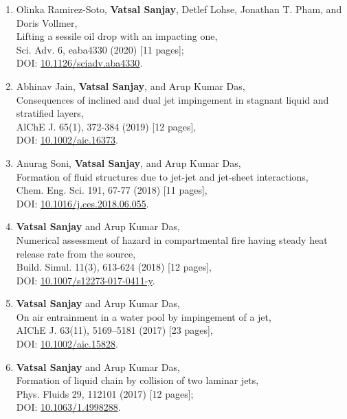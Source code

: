 \documentclass[11pt,a4paper,roman,english,colorlinks,linkcolor=true]{moderncv}
\begin{document}
\begin{enumerate}[leftmargin=2.5cm]
	\item Olinka Ramirez-Soto, \textbf{Vatsal Sanjay},  Detlef Lohse,  Jonathan T. Pham, and Doris Vollmer,\\
	Lifting a sessile oil drop with an impacting one,\\
	Sci. Adv. 6, eaba4330  (2020) [11 pages];\\
	DOI: \href{https://doi.org/10.1126/sciadv.aba4330}{10.1126/sciadv.aba4330}.	
	
	\item Abhinav Jain, \textbf{Vatsal Sanjay}, and Arup Kumar Das,\\
	Consequences of inclined and dual jet impingement in stagnant liquid and stratified layers,\\
	AlChE J. 65(1), 372-384  (2019) [12 pages],\\
	DOI: \href{https://doi.org/10.1002/aic.16373}{10.1002/aic.16373}.
	
	\item Anurag Soni, \textbf{Vatsal Sanjay}, and Arup Kumar Das,\\
	Formation of fluid structures due to jet-jet and jet-sheet interactions,\\
	Chem. Eng. Sci. 191, 67-77  (2018) [11 pages],\\
	DOI: \href{https://doi.org/10.1016/j.ces.2018.06.055}{10.1016/j.ces.2018.06.055}.
	
	\item \textbf{Vatsal Sanjay} and Arup Kumar Das,\\
	Numerical assessment of hazard in compartmental fire having steady heat release rate from the source,\\
	Build. Simul. 11(3), 613-624  (2018) [12 pages],\\
	DOI: \href{https://doi.org/10.1007/s12273-017-0411-y}{10.1007/s12273-017-0411-y}.
	
	\item \textbf{Vatsal Sanjay} and Arup Kumar Das,\\
	On air entrainment in a water pool by impingement of a jet,\\
	AIChE J. 63(11), 5169--5181  (2017) [23 pages],\\
	DOI: \href{https://doi.org/10.1002/aic.15828}{10.1002/aic.15828}.
	
	\item \textbf{Vatsal Sanjay} and Arup Kumar Das,\\
	Formation of liquid chain by collision of two laminar jets,\\
	Phys. Fluids 29, 112101  (2017) [12 pages];\\
	DOI: \href{https://doi.org/10.1063/1.4998288}{10.1063/1.4998288}.
	
\end{enumerate}
\end{document}

